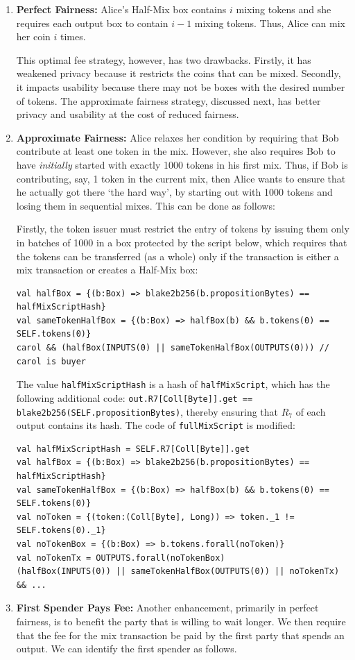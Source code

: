 \documentclass[11pt]{article}
\begin{document}
\begin{enumerate}
	\item \textbf{Perfect Fairness:} 
 Alice's Half-Mix box contains $i$ mixing tokens and she requires each output box to contain $i-1$ mixing tokens. Thus, Alice can mix her coin $i$ times. 
 
 This optimal fee strategy, however, has two drawbacks. Firstly, it has weakened privacy because it restricts the coins that can be mixed. Secondly, it impacts usability because there may not be boxes with the desired number of tokens. The approximate fairness strategy, discussed next, has better privacy and usability at the cost of reduced fairness.
 
 \item \textbf{Approximate Fairness:} Alice relaxes her condition by requiring that Bob contribute at least one token in the mix. %
 However, 
she also requires Bob to have {\em initially} started with exactly 1000 tokens in his first mix. Thus, if Bob is contributing, say, 1 token in the current mix, then Alice wants to ensure that he actually got there `the hard way', by starting out with 1000 tokens and losing them in sequential mixes. %
This can be done as follows:

Firstly, the token issuer must restrict the entry of tokens by issuing them only in batches of 1000 in a box protected by the script below,
which requires that the tokens can be transferred (as a whole) only if the transaction is either a mix transaction or creates a Half-Mix box: 
\begin{verbatim}
val halfBox = {(b:Box) => blake2b256(b.propositionBytes) == halfMixScriptHash}
val sameTokenHalfBox = {(b:Box) => halfBox(b) && b.tokens(0) == SELF.tokens(0)}
carol && (halfBox(INPUTS(0) || sameTokenHalfBox(OUTPUTS(0))) // carol is buyer
\end{verbatim}

The value \texttt{halfMixScriptHash} is a hash of \texttt{halfMixScript}, which has the following additional code: 
\texttt{out.R7[Coll[Byte]].get == blake2b256(SELF.propositionBytes)}, thereby ensuring that $R_7$ of each output contains its hash. The code of \texttt{fullMixScript} is modified:

\begin{verbatim}
val halfMixScriptHash = SELF.R7[Coll[Byte]].get
val halfBox = {(b:Box) => blake2b256(b.propositionBytes) == halfMixScriptHash}
val sameTokenHalfBox = {(b:Box) => halfBox(b) && b.tokens(0) == SELF.tokens(0)}
val noToken = {(token:(Coll[Byte], Long)) => token._1 != SELF.tokens(0)._1}
val noTokenBox = {(b:Box) => b.tokens.forall(noToken)}
val noTokenTx = OUTPUTS.forall(noTokenBox)
(halfBox(INPUTS(0)) || sameTokenHalfBox(OUTPUTS(0)) || noTokenTx) && ...
\end{verbatim}
\item \textbf{First Spender Pays Fee:} Another enhancement, primarily in perfect fairness, is to benefit the party that is willing to wait longer. We then require that the fee for the mix transaction be paid by the first party that spends an output. We can identify the first spender as follows. 


\end{enumerate}
\end{document}
